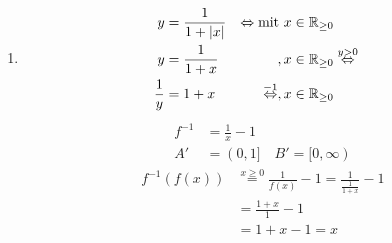 \begin{enumerate}[label=\alph*)]
    \item \begin{align*}
        y &= \frac{1}{1 + |x|} &\Leftrightarrow \text{mit } x \in \mathbb R_{\geq 0}\\
        y &= \frac{1}{1 + x} &, x \in \mathbb R_{\geq 0} & \overset{y > 0}{\Leftrightarrow}\\
        \frac{1}{y} &= 1 + x &\overset{-1}{\Leftrightarrow}, x \in \mathbb R_{\geq 0} \\
    \end{align*}
    \begin{align*}
        f^{-1} &= \frac{1}{x} - 1\\
        A' &= (0, 1] \quad B' = [0, \infty)
    \end{align*}
    \begin{align*}
        f^{-1}(f(x)) &\overset{x \geq 0}{=} \frac{1}{f(x)} - 1 = \frac{1}{\frac{1}{1 + x}} -1 \\
        &= \frac{1 + x}{1} - 1\\
        &= 1 + x - 1 = x
    \end{align*}
\end{enumerate}



